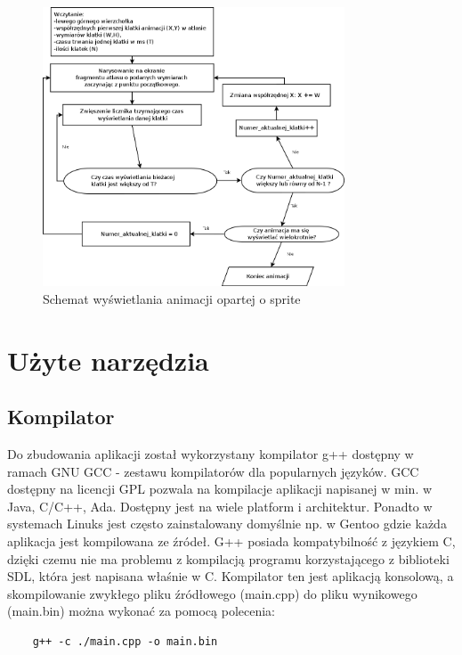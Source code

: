 \begin{figure}[h]
    \centering
    \includegraphics[width=0.8\textwidth,natwidth=410,natheight=142]{./Pictures/sprite_algorytm.png}
    \caption{Schemat wyświetlania animacji opartej o sprite}
\end{figure}

\section{Użyte narzędzia}

\subsection{Kompilator}
Do zbudowania aplikacji został wykorzystany kompilator g++ dostępny w ramach GNU GCC - zestawu kompilatorów dla popularnych języków. GCC dostępny na licencji GPL pozwala na kompilacje aplikacji napisanej w min. w Java, C/C++, Ada. Dostępny jest na wiele platform i architektur. Ponadto w systemach Linuks jest często zainstalowany domyślnie np. w Gentoo gdzie każda aplikacja jest kompilowana ze źródeł. G++ posiada kompatybilność z językiem C, dzięki czemu nie ma problemu z kompilacją programu korzystającego z biblioteki SDL, która jest napisana właśnie w C. Kompilator ten jest aplikacją konsolową, a skompilowanie zwykłego pliku źródłowego (main.cpp) do pliku wynikowego (main.bin) można wykonać za pomocą polecenia:
\begin{verbatim}
	g++ -c ./main.cpp -o main.bin
\end{verbatim}

